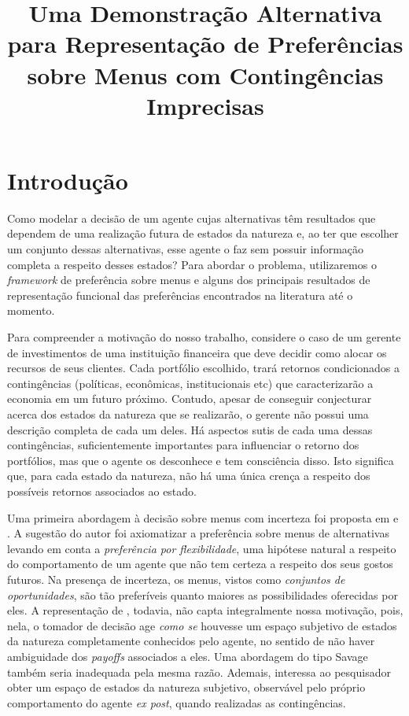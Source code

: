 \documentclass[11pt, a4paper]{article}
\title{Uma Demonstração Alternativa para Representação de Preferências sobre Menus com Contingências Imprecisas}
\author{}
\theoremstyle{nonumberplain}
\theoremstyle{plain}
\theoremstyle{plain}
\theoremstyle{plain}
\begin{document}
\date{}
\maketitle 

\tableofcontents

\section{Introdução}

Como modelar a decisão de um agente cujas alternativas têm resultados que dependem de uma realização futura de estados da natureza e, ao ter que escolher um conjunto dessas alternativas, esse agente o faz sem possuir informação completa a respeito desses estados? Para abordar o problema, utilizaremos o \emph{framework} de preferência sobre menus e alguns dos principais resultados de representação funcional das preferências encontrados na literatura até o momento.

Para compreender a motivação do nosso trabalho, considere o caso de um gerente de investimentos de uma instituição financeira que deve decidir como alocar os recursos de seus clientes. Cada portfólio escolhido, trará retornos condicionados a contingências (políticas, econômicas, institucionais etc) que caracterizarão a economia em um futuro próximo. Contudo, apesar de conseguir conjecturar acerca dos estados da natureza que se realizarão, o gerente não possui uma descrição completa de cada um deles. Há aspectos sutis de cada uma dessas contingências, suficientemente importantes para influenciar o retorno dos portfólios, mas que o agente os desconhece e tem consciência disso. Isto significa que, para cada estado da natureza, não há uma única crença a respeito dos possíveis retornos associados ao estado. 

Uma primeira abordagem à decisão sobre menus com incerteza foi proposta em \cite{Kreps1979} e \cite{Kreps1992}. A sugestão do autor foi axiomatizar a preferência sobre menus de alternativas levando em conta a \emph{preferência por flexibilidade}, uma hipótese natural a respeito do comportamento de um agente que não tem certeza a respeito dos seus gostos futuros. Na presença de incerteza, os menus, vistos como \emph{conjuntos de oportunidades}, são tão preferíveis quanto maiores as possibilidades oferecidas por eles. A representação de \cite{Kreps1979}, todavia, não capta integralmente nossa motivação, pois, nela, o tomador de decisão age \emph{como se} houvesse um espaço subjetivo de estados da natureza completamente conhecidos pelo agente, no sentido de não haver ambiguidade dos \emph{payoffs} associados a eles. Uma abordagem do tipo Savage também seria inadequada pela mesma razão. Ademais, interessa ao pesquisador obter um espaço de estados da natureza subjetivo, observável pelo próprio comportamento do agente \emph{ex post}, quando realizadas as contingências.
\end{document}
